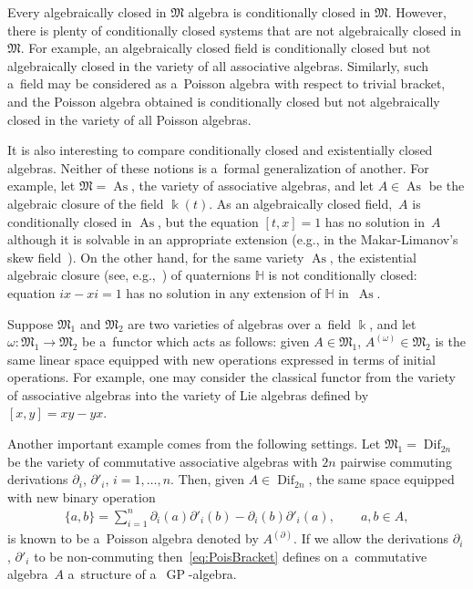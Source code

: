 \documentclass[pdftex]{sigma}
\begin{document}
Every algebraically closed in $\mathfrak M$ algebra is conditionally closed in $\mathfrak M$.
However, there is plenty of conditionally closed systems that are not algebraically closed in $\mathfrak M$.
For example, an algebraically closed f\/ield is conditionally closed but not algebraically closed in the variety of all
associative algebras.
Similarly, such a~f\/ield may be considered as a~Poisson algebra with respect to trivial bracket, and the Poisson algebra
obtained is conditionally closed but not algebraically closed in the variety of all Poisson algebras.

It is also interesting to compare conditionally closed and existentially closed algebras.
Neither of these notions is a~formal generalization of another.
For example, let $\mathfrak M=\operatorname{As}$, the variety of associative algebras, and let $A\in \operatorname{As}$ be the algebraic closure of
the f\/ield $\Bbbk(t)$.
As an algebraically closed f\/ield,~$A$ is conditionally closed in $\operatorname{As}$, but the equation $[t,x]=1$ has no solution in~$A$
although it is solvable in an appropriate extension (e.g., in the Makar-Limanov's skew f\/ield~\cite{LML85}).
On the other hand, for the same variety $\operatorname{As}$, the existential algebraic closure (see, e.g.,~\cite[Chapter~III]{Cherlin})
of quaternions $\mathbb H$ is not conditionally closed: equation $ix-xi=1$ has no solution in any extension of $\mathbb
H$ in~$\operatorname{As}$.

Suppose $\mathfrak M_1$ and $\mathfrak M_2$ are two varieties of algebras over a~f\/ield $\Bbbk $, and let $\omega:
\mathfrak M_1 \to \mathfrak M_2$ be a~functor which acts as follows: given $A\in \mathfrak M_1$, $A^{(\omega)}\in
\mathfrak M_2$ is the same linear space equipped with new operations expressed in terms of initial operations.
For example, one may consider the classical functor from the variety of associative algebras into the variety of Lie
algebras def\/ined by $[x,y] = xy-yx$.

Another important example comes from the following settings.
Let $\mathfrak M_1 = \operatorname{Dif}_{2n}$ be the variety of commutative associative algebras with $2n$ pairwise commuting
derivations $\partial_i$, $\partial'_i$, $i=1,\dots, n$.
Then, given $A\in \operatorname{Dif}_{2n}$, the same space equipped with new binary operation
\begin{gather}
\label{eq:PoisBracket}
\{a,b\} = \sum\limits_{i=1}^n \partial_i(a)\partial'_i(b) - \partial_i(b)\partial'_i(a),
\qquad
a,b\in A,
\end{gather}
is known to be a~Poisson algebra denoted by $A^{(\partial)}$.
If we allow the derivations $\partial_i$, $\partial'_i$ to be non-commuting then~\eqref{eq:PoisBracket} def\/ines on
a~commutative algebra~$A$ a~structure of a~$\operatorname{GP}$-algebra.
\end{document}

